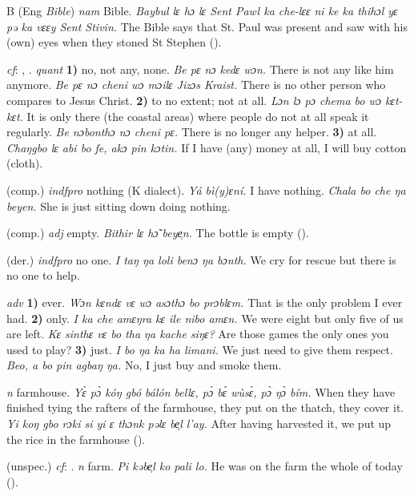 \begin{letter}{B}
 (Eng \textit{Bible}) \textit{nam} Bible. \textit{Baybul lɛ hɔ lɛ Sent Pawl ka che-lɛɛ ni ke ka thihɔl yɛ pə ka vɛɛy Sent Stivin.} The Bible says that St. Paul was present and saw with his (own) eyes when they stoned St Stephen (\citealt{Pichl1967}). 

 \textit{cf}: , . \textit{quant} \textbf{1)} no, not any, none. \textit{Be pɛ nɔ kedɛ wɔn.} There is not any like him anymore. \textit{Be pɛ nɔ cheni wɔ mɔilɛ Jizɔs Kraist.} There is no other person who compares to Jesus Christ. \textbf{2)} to no extent; not at all. \textit{Lɔn lɔ pɔ chema bo wɔ kɛt-kɛt.} It is only there (the coastal areas) where people do not at all speak it regularly. \textit{Be nɔbonthɔ nɔ cheni pɛ.} There is no longer any helper. \textbf{3)} at all. \textit{Chaŋgbo lɛ abi bo fe, akɔ pin kɔtin.} If I have (any) money at all, I will buy cotton (cloth).

 (comp.) \textit{indfpro} nothing (K dialect). \textit{Yá bì(y)ɛní.} I have nothing. \textit{Chala bo che ŋa beyen.} She is just sitting down doing nothing.

 (comp.) \textit{adj} empty. \textit{Bithir lɛ hɔ̃ beye̹n.} The bottle is empty (\citealt{Pichl1967}). 

 (der.) \textit{indfpro} no one. \textit{I taŋ ŋa loli benɔ ŋa bɔnth.} We cry for rescue but there is no one to help.

 \textit{adv} \textbf{1)} ever. \textit{Wɔn kɛndɛ vɛ wɔ asɔthɔ bo prɔblɛm.} That is the only problem I ever had. \textbf{2)} only. \textit{I ka che amɛŋra kɛ ile nibo amɛn.} We were eight but only five of us are left. \textit{Kɛ sinthɛ vɛ bo tha ŋa kache siŋɛ?} Are those games the only ones you used to play? \textbf{3)} just. \textit{I bo ŋa ka ha limani.} We just need to give them respect. \textit{Beo, a bo pin agbaŋ ŋa.} No, I just buy and smoke them.

 \textit{n} farmhouse. \textit{Yɛ̀ pɔ̀ kóŋ gbó bálón bellɛ, pɔ̀ bɛ́ wùsɛ̀, pɔ̀ ŋɔ̀ bím.} When they have finished tying the rafters of the farmhouse, they put on the thatch, they cover it. \textit{Yi koŋ gbo rɔki si yi ɛ thɔnk pəlɛ be̹l l'ay.} After having harvested it, we put up the rice in the farmhouse (\citealt{Pichl1967}). 

 (unspec.) \textit{cf}: . \textit{n} farm. \textit{Pi kəbe̹l ko pali lo.} He was on the farm the whole of today (\citealt{Pichl1967}).


\end{letter}
